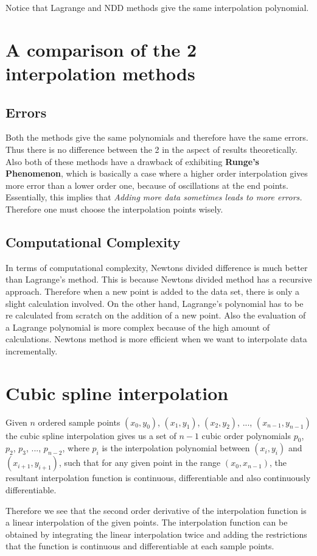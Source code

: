 \documentclass[12,a4paper]{article}
\begin{document}
   Notice that Lagrange and NDD methods give the same interpolation polynomial.
   \newpage
   \section{A comparison of the 2 interpolation methods}
   \subsection{Errors}
   Both the methods give the same polynomials and therefore have the same errors. Thus there is no difference between the 2 in the aspect of results theoretically. Also both of these methods have a drawback of exhibiting \textbf{Runge's Phenomenon}, which is basically a case where a higher order interpolation gives more error than a lower order one, because of oscillations at the end points. Essentially, this implies that \emph{Adding more data sometimes leads to more errors.} Therefore one must choose the interpolation points wisely.
   \subsection{Computational Complexity}
   In terms of computational complexity, Newtons divided difference is much better than Lagrange's method. This is because Newtons divided method has a recursive approach. Therefore when a new point is added to the data set, there is only a slight calculation involved. On the other hand, Lagrange's polynomial has to be re calculated from scratch on the addition of a new point. Also the evaluation of a Lagrange polynomial is more complex because of the high amount of calculations. Newtons method is more efficient when we want to interpolate data incrementally.
   \section{Cubic spline interpolation}
   Given $n$ ordered sample points $(x_0,y_0)$, $(x_1,y_1)$,  $(x_2,y_2)$, ..., $(x_{n-1},y_{n-1})$ the cubic spline interpolation gives us a set of $n-1$ cubic order polynomials $p_0$, $p_2$, $p_3$, ..., $p_{n-2}$, where $p_i$ is the interpolation polynomial between $(x_i,y_i)$ and $(x_{i+1}, y_{i+1})$, such that for any given point in the range $(x_0, x_{n-1})$, the resultant interpolation function is continuous, differentiable and also continuously differentiable.
   
   Therefore we see that the second order derivative of the interpolation function is a linear interpolation of the given points. The interpolation function can be obtained by integrating the linear interpolation twice and adding the restrictions that the function is continuous and differentiable at each sample points.
   
\end{document}
